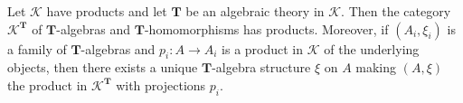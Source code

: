 Let $\mathcal{K}$ have products and let $\mathbf{T}$ be an algebraic theory in $\mathcal{K}$. Then the category $\mathcal{K}^{\mathbf{T}}$ of $\mathbf{T}$-algebras and $\mathbf{T}$-homomorphisms has products. Moreover, if $(A_i, \xi_i)$ is a family of $\mathbf{T}$-algebras and $p_i: A \longrightarrow A_i$ is a product in $\mathcal{K}$ of the underlying objects, then there exists a unique $\mathbf{T}$-algebra structure $\xi$ on $A$ making $(A, \xi)$ the product in $\mathcal{K}^{\mathbf{T}}$ with projections $p_i$.

